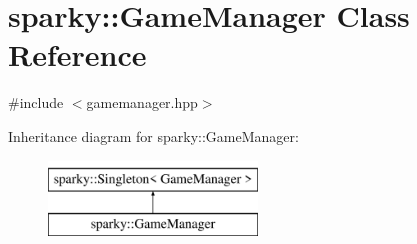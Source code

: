 \hypertarget{classsparky_1_1_game_manager}{}\section{sparky\+:\+:Game\+Manager Class Reference}
\label{classsparky_1_1_game_manager}


{\ttfamily \#include $<$gamemanager.\+hpp$>$}

Inheritance diagram for sparky\+:\+:Game\+Manager\+:\begin{figure}[H]
\begin{center}
\leavevmode
\includegraphics[height=2.000000cm]{classsparky_1_1_game_manager}
\end{center}
\end{figure}
